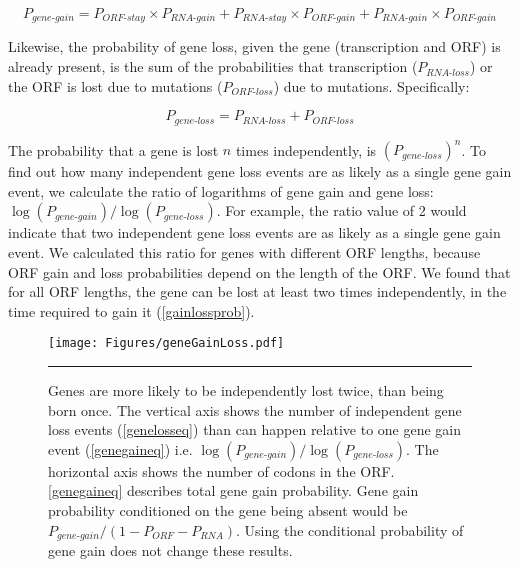 \documentclass[12pt,a4paper]{article}
\begin{document}
\begin{equation}
P_\textit{gene-gain} = P_\textit{ORF-stay}\times P_\textit{RNA-gain} + P_\textit{RNA-stay}\times P_\textit{ORF-gain} + P_\textit{RNA-gain}\times P_\textit{ORF-gain}
\label{genegaineq}
\end{equation}

Likewise, the probability of gene loss, given the gene (transcription and ORF) is already present, is the sum of the probabilities that transcription ($P_\textit{RNA-loss}$) or the ORF is lost due to mutations ($P_\textit{ORF-loss}$) due to mutations. Specifically:

\begin{equation}
P_\textit{gene-loss} = P_\textit{RNA-loss} + P_\textit{ORF-loss}
\label{genelosseq}
\end{equation}

The probability that a gene is lost $n$ times independently, is $(P_\textit{gene-loss})^{n}$. To find out how many independent gene loss events are as likely as a single gene gain event, we calculate the ratio of logarithms of gene gain and gene loss: $\log(P_\textit{gene-gain})/\log(P_\textit{gene-loss})$. For example, the ratio value of 2 would indicate that two independent gene loss events are as likely as a single gene gain event. We calculated this ratio for genes with different ORF lengths, because ORF gain and loss probabilities depend on the length of the ORF. We found that for all ORF lengths, the gene can be lost at least two times independently, in the time required to gain it (\autoref{gainlossprob}). 

\begin{figure}[!t]
\centering
\texttt{[image: Figures/geneGainLoss.pdf]}
\caption{Genes are more likely to be independently lost twice, than being born once. The vertical axis shows the number of independent gene loss events (\autoref{genelosseq}) than can happen relative to one gene gain event (\autoref{genegaineq}) i.e. $\log(P_\textit{gene-gain})/\log(P_\textit{gene-loss})$. The horizontal axis shows the number of codons in the ORF. \autoref{genegaineq} describes total gene gain probability. Gene gain probability conditioned on the gene being absent would be $P_\textit{gene-gain}/(1-P_\textit{ORF} - P_\textit{RNA})$. Using the conditional probability of gene gain does not change these results.}
\label{gainlossprob}

\vspace{1ex}
\hrule
\end{figure}
\end{document}
